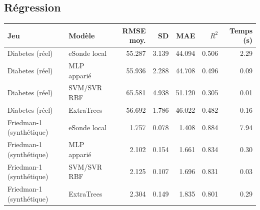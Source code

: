 \documentclass[11pt,a4paper]{article}
\begin{document}
\subsection{Régression}
\begin{longtable}{p{3.0cm}p{2.1cm}r r r r r}
\toprule Jeu & Modèle & RMSE moy. & SD & MAE & $R^2$ & Temps (s)\\\midrule\endhead
Diabetes (réel) & eSonde local & 55.287 & 3.139 & 44.094 & 0.506 & 2.29 \\
Diabetes (réel) & MLP apparié & 55.936 & 2.288 & 44.708 & 0.496 & 0.09 \\
Diabetes (réel) & SVM/SVR RBF & 65.581 & 4.938 & 51.120 & 0.305 & 0.01 \\
Diabetes (réel) & ExtraTrees & 56.692 & 1.786 & 46.022 & 0.482 & 0.16 \\
Friedman-1 (synthétique) & eSonde local & 1.757 & 0.078 & 1.408 & 0.884 & 7.94 \\
Friedman-1 (synthétique) & MLP apparié & 2.102 & 0.154 & 1.661 & 0.834 & 0.30 \\
Friedman-1 (synthétique) & SVM/SVR RBF & 2.125 & 0.107 & 1.696 & 0.831 & 0.03 \\
Friedman-1 (synthétique) & ExtraTrees & 2.304 & 0.149 & 1.835 & 0.801 & 0.29 \\
\bottomrule\end{longtable}
\end{document}
